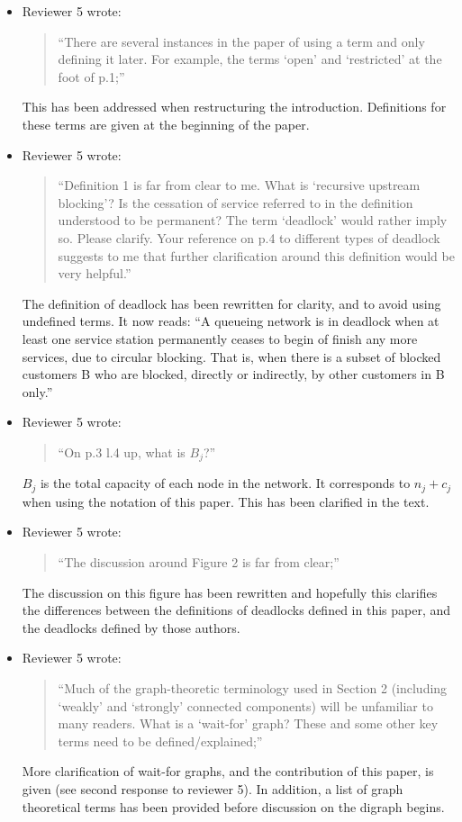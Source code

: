 \documentclass{article}
\begin{document}
\begin{itemize}
\item Reviewer 5 wrote:
\begin{quote}
``There are several instances in the paper of using a term and only defining
it later.
For example, the terms ‘open’ and ‘restricted’ at the foot of p.1;''
\end{quote}
This has been addressed when restructuring the introduction.
Definitions for these terms are given at the beginning of the paper.

\item Reviewer 5 wrote:
\begin{quote}
``Definition 1 is far from clear to me.
What is ‘recursive upstream blocking’?
Is the cessation of service referred to in the definition understood to be
permanent?
The term ‘deadlock’ would rather imply so.
Please clarify.
Your reference on p.4 to different types of deadlock suggests to me that
further clarification around this definition would be very helpful.''
\end{quote}
The definition of deadlock has been rewritten for clarity, and to avoid using
undefined terms.
It now reads:
``A queueing network is in deadlock when at least one service station
permanently ceases to begin of finish any more services, due to circular
blocking.
That is, when there is a subset of blocked customers B who are blocked,
directly or indirectly, by other customers in B only.''

\item Reviewer 5 wrote:
\begin{quote}
``On p.3 l.4 up, what is $B_j$?''
\end{quote}
$B_j$ is the total capacity of each node in the network.
It corresponds to $n_j + c_j$ when using the notation of this paper.
This has been clarified in the text.

\item Reviewer 5 wrote:
\begin{quote}
``The discussion around Figure 2 is far from clear;''
\end{quote}
The discussion on this figure has been rewritten and hopefully this clarifies
the differences between the definitions of deadlocks defined in this paper,
and the deadlocks defined by those authors.

\item Reviewer 5 wrote:
\begin{quote}
``Much of the graph-theoretic terminology used in Section 2 (including
‘weakly’ and ‘strongly’ connected components) will be unfamiliar to many
readers.
What is a ‘wait-for’ graph? These and some other key terms need to be
defined/explained;''
\end{quote}
More clarification of wait-for graphs, and the contribution of this paper,
is given (see second response to reviewer 5).
In addition, a list of graph theoretical terms has been provided before
discussion on the digraph begins.


\end{itemize}
\end{document}
